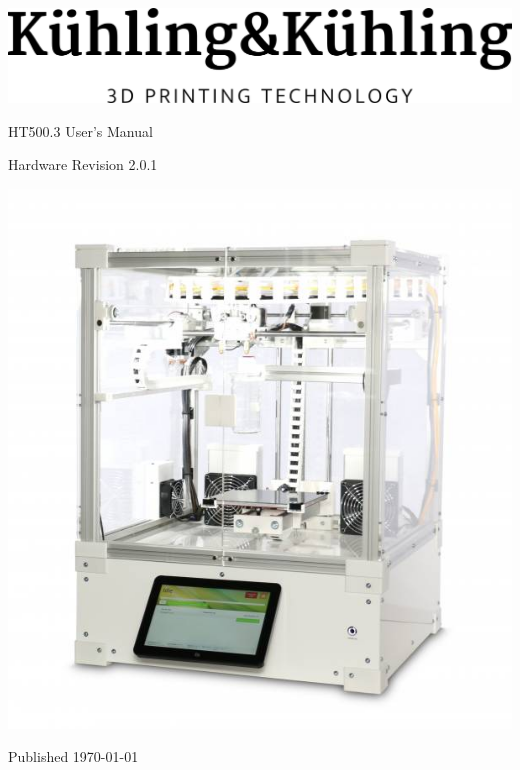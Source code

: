 \documentclass[english, a4paper]{article}
\newcommand{\hardwarerevision}{2.0.1}
\begin{document}

\begin{titlepage}
  \centering
  \includegraphics[width=.2\linewidth]{./img/logo_kuehlingkuehling.png}
  \par\vspace{1cm}
  \par\Huge HT500.3 User's Manual
  \par\vspace{1cm}
  \par\large Hardware Revision \hardwarerevision
  \par\vspace{3cm}
  \includegraphics[width=.7\linewidth]{./img/ht500_freigestellt.jpg}
  \vfill
  \par\large Published \today
\end{titlepage}

\clearpage
\thispagestyle{empty}
\mbox{}
\vfill


\clearpage
{}
\tableofcontents

\clearpage
{}











\clearpage
{}
\renewcommand*{\thepage}{Q-\arabic{page}}

\end{document}

